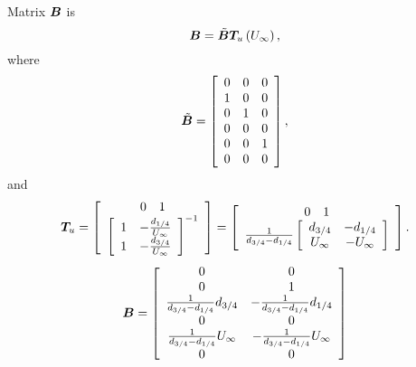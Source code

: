 Matrix $\bm{B}$ is
\begin{equation}
	\bm{B} = \tilde{\bm{B}} \bm{T}_u \left( U_\infty \right),
\end{equation}
where
\begin{equation}
	\tilde{\bm{B}} = \left[
		\begin{array}{ccc}
			0 & 0 & 0 \\
			1 & 0 & 0 \\
			0 & 1 & 0 \\
			0 & 0 & 0 \\
			0 & 0 & 1 \\
			0 & 0 & 0 
		\end{array}
		\right],
\end{equation}
and
\begin{equation}
	\bm{T}_u = \left[
		\begin{array}{c}
		\begin{array}{cc}
		0 & 1
		\end{array}\\ 
		\left[
		\begin{array}{cc}
			1 & -\frac{d_{1/4}}{U_\infty} \\
			1 & -\frac{d_{3/4}}{U_\infty} 
		\end{array}
		\right]^{-1}
		\end{array}
		\right] = \left[ 
		\begin{array}{c}
		\begin{array}{cc}
		0 & 1
		\end{array}\\
		\frac{1}{d_{3/4}-d_{1/4}} \left[  
		\begin{array}{cc}
			d_{3/4} & -{d_{1/4}} \\
			U_\infty & -U_\infty
		\end{array}
		\right]
		\end{array}
		\right].
\end{equation}
\begin{equation}
	\bm{B} = \left[
		\begin{array}{cc}
		0 & 0 \\
		0 & 1 \\
		\frac{1}{d_{3/4}-d_{1/4}} d_{3/4} & 
		-\frac{1}{d_{3/4}-d_{1/4}} d_{1/4}\\ 
		0 & 0 \\
		\frac{1}{d_{3/4}-d_{1/4}} U_\infty & 
		-\frac{1}{d_{3/4}-d_{1/4}} U_\infty \\ 
		0 & 0
		\end{array}
		\right]
\end{equation}
		

